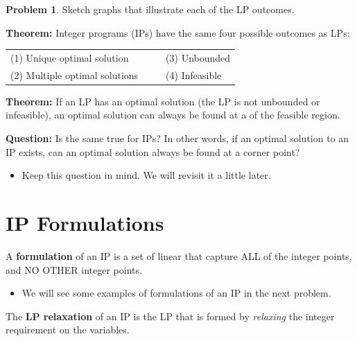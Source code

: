 \documentclass[11pt]{article}
\theoremstyle{definition}
\newtheorem{problem}{Problem}
\newcommand{\answerbox}[3]{%
  \fbox{%
    \begin{minipage}[#1]{#2}
      \hfill\vspace{#3}
    \end{minipage}
  }
}
\newcommand{\wordbox}{\answerbox{c}{1.2in}{.7cm}}
\begin{document}
\begin{problem}
Sketch graphs that illustrate each of the  LP outcomes.
\end{problem}

\answerbox{c}{.5\textwidth}{2in} \answerbox{c}{.5\textwidth}{2in}

\answerbox{c}{.5\textwidth}{2in} \answerbox{c}{.5\textwidth}{2in}


\begin{tcolorbox}
\textbf{Theorem:}  Integer programs (IPs) have the same four possible outcomes as LPs: 

\medskip
\begin{tabular}{ll}
(1) Unique optimal solution  ~~~~~& (3) Unbounded    \\
(2) Multiple optimal solutions & (4) Infeasible
\end{tabular}

\end{tcolorbox}
\begin{tcolorbox}
\textbf{Theorem:} If an LP has an optimal solution (the LP is not unbounded or infeasible), an optimal solution can always be found at a 
\wordbox \wordbox %
of the feasible region.
\end{tcolorbox}

\textbf{Question:}  Is the same true for IPs?  In other words, if an optimal solution to an IP exists, can an optimal solution always be found at a corner point?  
\begin{itemize}
\item Keep this question in mind.  We will revisit it a little later.
\end{itemize}

\vfill

\section{IP Formulations}

\begin{tcolorbox}
A \textbf{formulation} of an IP is a set of linear \wordbox that capture ALL of the \wordbox integer points, and NO OTHER integer points.
\end{tcolorbox}

\begin{itemize}
\item  We will see some examples of formulations of an IP in the next problem.
\end{itemize}

\bigskip
\begin{tcolorbox}
The \textbf{LP relaxation} of an IP is the LP that is formed by \emph{relaxing} the integer requirement on the variables.
\end{tcolorbox}
\end{document}
